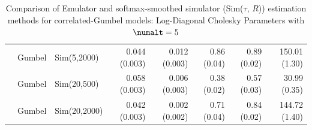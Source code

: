 \begin{table}[htbp]
\begin{tabular}{@{}rllrrrrr@{}}
 & Gumbel & Sim(5,2000) & 0.044 (0.003) & 0.012 (0.003) & 0.86 (0.04) & 0.89 (0.02) & 150.01 (1.30) \\
 & Gumbel & Sim(20,500) & 0.058 (0.003) & 0.006 (0.003) & 0.38 (0.02) & 0.57 (0.03) & 30.99 (0.35) \\
 & Gumbel & Sim(20,2000) & 0.042 (0.003) & 0.002 (0.002) & 0.71 (0.04) & 0.84 (0.02) & 144.72 (1.40) \\
\bottomrule
\end{tabular}
\caption{Comparison of Emulator and softmax-smoothed simulator (Sim($\tau$, $R$)) estimation methods for correlated-Gumbel models: Log-Diagonal Cholesky Parameters with $\numalt=5$}
\label{tab:emulator_vs_sim_gumbel:5:ldiag}
\end{table}